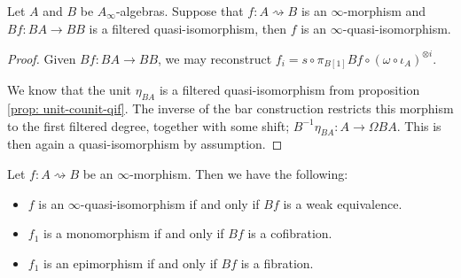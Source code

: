 \documentclass[../thesis.tex]{subfiles}
\begin{document}
        \begin{lemma}\label{lem: qif-infty-qi}
            Let $A$ and $B$ be $A_\infty$-algebras. Suppose that $f : A \rightsquigarrow B$ is an $\infty$-morphism and $Bf : BA \rightarrow BB$ is a filtered quasi-isomorphism, then $f$ is an $\infty$-quasi-isomorphism. 
        \end{lemma}

        \begin{proof}
            Given $Bf : BA \rightarrow BB$, we may reconstruct $f_i = s \circ \pi_{B[1]} Bf \circ (\omega \circ \iota_A)^{\otimes i}$.

            We know that the unit $\eta_{BA}$ is a filtered quasi-isomorphism from proposition \ref{prop: unit-counit-qif}. The inverse of the bar construction restricts this morphism to the first filtered degree, together with some shift; $B^{-1}\eta_{BA} : A \rightarrow \Omega BA$. This is then again a quasi-isomorphism by assumption.
        \end{proof}

        \begin{proposition}\label{prop: coherent-model-structure}
            Let $f : A \rightsquigarrow B$ be an $\infty$-morphism. Then we have the following:
            \begin{itemize}
                \item $f$ is an $\infty$-quasi-isomorphism if and only if $Bf$ is a weak equivalence.
                \item $f_1$ is a monomorphism if and only if $Bf$ is a cofibration.
                \item $f_1$ is an epimorphism if and only if $Bf$ is a fibration.
            \end{itemize}
        \end{proposition}
\end{document}
